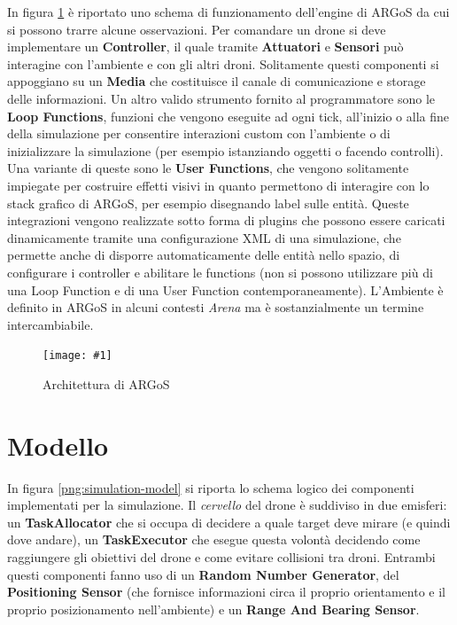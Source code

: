 \documentclass[a4paper,11pt,oneside, table]{article}
\newcommand{\putimage}[4] {
	\begin{figure}[H]
	    \centering
	    \texttt{[image: \#1]}
	    \caption{#2}\label{#3}
	\end{figure}
}
\begin{document}
In figura \ref{png:architecture} \`e riportato uno schema di funzionamento dell'engine di ARGoS da cui si possono trarre alcune osservazioni.
Per comandare un drone si deve implementare un \textbf{Controller}, il quale tramite \textbf{Attuatori} e \textbf{Sensori} pu\`o interagine con l'ambiente e con gli altri droni.
Solitamente questi componenti si appoggiano su un \textbf{Media} che costituisce il canale di comunicazione e storage delle informazioni.
Un altro valido strumento fornito al programmatore sono le \textbf{Loop Functions}, funzioni che vengono eseguite ad ogni tick, all'inizio o alla fine della simulazione per consentire interazioni custom con l'ambiente o di inizializzare la simulazione (per esempio istanziando oggetti o facendo controlli).
Una variante di queste sono le \textbf{User Functions}, che vengono solitamente impiegate per costruire effetti visivi in quanto permettono di interagire con lo stack grafico di ARGoS, per esempio disegnando label sulle entit\`a.
Queste integrazioni vengono realizzate sotto forma di plugins che possono essere caricati dinamicamente tramite una configurazione XML di una simulazione, che permette anche di disporre automaticamente delle entit\`a nello spazio, di configurare i controller e abilitare le functions (non si possono utilizzare pi\`u di una Loop Function e di una User Function contemporaneamente).
L'Ambiente \`e definito in ARGoS in alcuni contesti \textit{Arena} ma \`e sostanzialmente un termine intercambiabile.

\putimage{images/architecture.png}{Architettura di ARGoS}{png:architecture}{0.99}

\section{Modello}

In figura \ref{png:simulation-model} si riporta lo schema logico dei componenti implementati per la simulazione.
Il \textit{cervello} del drone \`e suddiviso in due emisferi: un \textbf{TaskAllocator} che si occupa di decidere a quale target deve mirare (e quindi dove andare), un \textbf{TaskExecutor} che esegue questa volont\`a decidendo come raggiungere gli obiettivi del drone e come evitare collisioni tra droni.
Entrambi questi componenti fanno uso di un \textbf{Random Number Generator}, del \textbf{Positioning Sensor} (che fornisce informazioni circa il proprio orientamento e il proprio posizionamento nell'ambiente) e un \textbf{Range And Bearing Sensor}.
\end{document}
